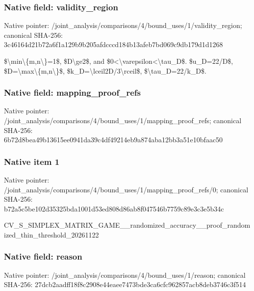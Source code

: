 \documentclass[10pt,a4paper]{article}
\begin{document}
\subsubsection{Native field: validity\_region}


Native pointer: /joint\_analysis/comparis\allowbreak{}ons/4/bound\_uses/1/valid\allowbreak{}ity\_region; canonical SHA-256: 3c46164d21b72a6f1a129b9b\allowbreak{}205afdcccd184b13afeb7bd0\allowbreak{}69c9db179d1d1268


\$\textbackslash{}min\textbackslash{}\{m,n\textbackslash{}\}=1\$, \$D\textbackslash{}ge2\$, and \$0<\textbackslash{}varepsilon<\textbackslash{}tau\_D\$. \$u\_D=22/D\$, \$D=\textbackslash{}max\textbackslash{}\{m,n\textbackslash{}\}\$, \$k\_D=\textbackslash{}lceil2D/3\textbackslash{}rceil\$, \$\textbackslash{}tau\_D=22/k\_D\$.


\subsubsection{Native field: mapping\_proof\_refs}


Native pointer: /joint\_analysis/comparis\allowbreak{}ons/4/bound\_uses/1/mappi\allowbreak{}ng\_proof\_refs; canonical SHA-256: 6b72d8bea49b13615ee0941d\allowbreak{}a39c4df49214eb9a874aba12\allowbreak{}bb3a51e10bfaac50



\subsubsection{Native item 1}


Native pointer: /joint\_analysis/comparis\allowbreak{}ons/4/bound\_uses/1/mappi\allowbreak{}ng\_proof\_refs/0; canonical SHA-256: b72a5c5be102d35325bda100\allowbreak{}1d53ed808d86ab8f047546b7\allowbreak{}759c89e3c3e5b34c


CV\_S\_SIMPLEX\_MATRIX\_GAME\allowbreak{}\_\_randomized\_accuracy\_\_p\allowbreak{}roof\_randomized\_thin\_thr\allowbreak{}eshold\_20261122


\subsubsection{Native field: reason}


Native pointer: /joint\_analysis/comparis\allowbreak{}ons/4/bound\_uses/1/reaso\allowbreak{}n; canonical SHA-256: 27dcb2aadff18f8c2908e44e\allowbreak{}aee7473bde3ca6cfc962857a\allowbreak{}cb8deb3746c3f514
\end{document}
